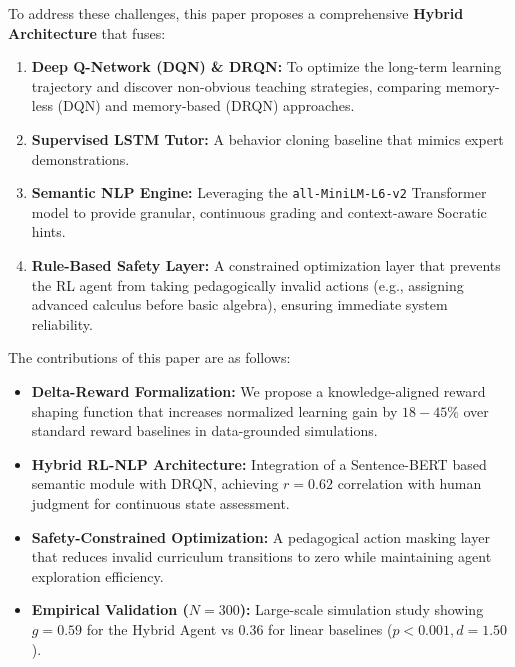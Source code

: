 \documentclass[conference]{IEEEtran}
\begin{document}
To address these challenges, this paper proposes a comprehensive \textbf{Hybrid Architecture} that fuses:
\begin{enumerate}
    \item \textbf{Deep Q-Network (DQN) \& DRQN:} To optimize the long-term learning trajectory and discover non-obvious teaching strategies, comparing memory-less (DQN) and memory-based (DRQN) approaches.
    \item \textbf{Supervised LSTM Tutor:} A behavior cloning baseline that mimics expert demonstrations.
    \item \textbf{Semantic NLP Engine:} Leveraging the \texttt{all-MiniLM-L6-v2} Transformer model to provide granular, continuous grading and context-aware Socratic hints.
    \item \textbf{Rule-Based Safety Layer:} A constrained optimization layer that prevents the RL agent from taking pedagogically invalid actions (e.g., assigning advanced calculus before basic algebra), ensuring immediate system reliability.
\end{enumerate}

The contributions of this paper are as follows:
\begin{itemize}
    \item \textbf{Delta-Reward Formalization:} We propose a knowledge-aligned reward shaping function that increases normalized learning gain by $18-45\%$ over standard reward baselines in data-grounded simulations.
    \item \textbf{Hybrid RL-NLP Architecture:} Integration of a Sentence-BERT based semantic module with DRQN, achieving $r=0.62$ correlation with human judgment for continuous state assessment.
    \item \textbf{Safety-Constrained Optimization:} A pedagogical action masking layer that reduces invalid curriculum transitions to zero while maintaining agent exploration efficiency.
    \item \textbf{Empirical Validation ($N=300$):} Large-scale simulation study showing $g=0.59$ for the Hybrid Agent vs $0.36$ for linear baselines ($p < 0.001, d = 1.50$).
\end{itemize}
\begin{center}
\end{center}
\end{document}
